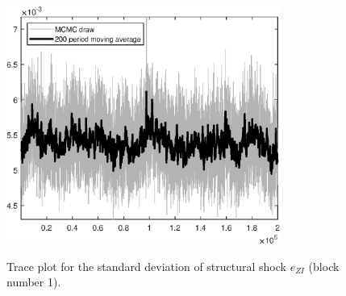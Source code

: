 \begin{figure}[H]
\centering
  \includegraphics[width=0.8\textwidth]{RBC_growth/graphs/TracePlot_SE_e_ZI_blck_1}\\
    \caption{Trace plot for the standard deviation of structural shock ${e_{ZI}}$ (block number 1).}
\end{figure}
